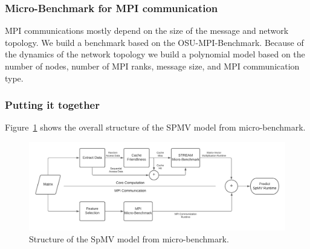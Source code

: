 \documentclass[sigconf,review,anonymous]{acmart}
\begin{document}
\subsubsection{Micro-Benchmark for MPI communication}
MPI communications mostly depend on the size of the message and
network topology. We build a benchmark based on the OSU-MPI-Benchmark.
Because of the dynamics of the network topology we build a polynomial
model based on the number of nodes, number of MPI ranks, message size,
and MPI communication type. 

\subsubsection{Putting it together}

Figure~\ref{fig:spmv-model-from-benchmark} shows the overall structure of the SPMV model from micro-benchmark.

\begin{figure}[hbt!]
	\centering
	\includegraphics[width=0.96\linewidth]{figures/spmv_hardware_model.pdf}
	\caption{Structure of the SpMV model from micro-benchmark.}
	\label{fig:spmv-model-from-benchmark}
\end{figure}
\end{document}
